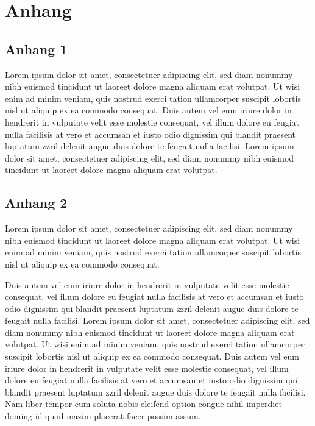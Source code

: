 \chapter {Anhang}

\section{Anhang 1}

Lorem ipsum dolor sit amet, consectetuer adipiscing elit, sed diam
nonummy nibh euismod tincidunt ut laoreet dolore magna aliquam erat
volutpat. Ut wisi enim ad minim veniam, quis nostrud exerci tation
ullamcorper suscipit lobortis nisl ut aliquip ex ea commodo
consequat. Duis autem vel eum iriure dolor in hendrerit in vulputate
velit esse molestie consequat, vel illum dolore eu feugiat nulla
facilisis at vero et accumsan et iusto odio dignissim qui blandit
praesent luptatum zzril delenit augue duis dolore te feugait nulla
facilisi. Lorem ipsum dolor sit amet, consectetuer adipiscing elit,
sed diam nonummy nibh euismod tincidunt ut laoreet dolore magna
aliquam erat volutpat.

\section{Anhang 2}

Lorem ipsum dolor sit amet, consectetuer adipiscing elit, sed diam
nonummy nibh euismod tincidunt ut laoreet dolore magna aliquam erat
volutpat. Ut wisi enim ad minim veniam, quis nostrud exerci tation
ullamcorper suscipit lobortis nisl ut aliquip ex ea commodo
consequat.


Duis autem vel eum iriure dolor in hendrerit in vulputate velit esse
molestie consequat, vel illum dolore eu feugiat nulla facilisis at
vero et accumsan et iusto odio dignissim qui blandit praesent
luptatum zzril delenit augue duis dolore te feugait nulla facilisi.
Lorem ipsum dolor sit amet, consectetuer adipiscing elit, sed diam
nonummy nibh euismod tincidunt ut laoreet dolore magna aliquam erat
volutpat. Ut wisi enim ad minim veniam, quis nostrud exerci tation
ullamcorper suscipit lobortis nisl ut aliquip ex ea commodo
consequat. Duis autem vel eum iriure dolor in hendrerit in vulputate
velit esse molestie consequat, vel illum dolore eu feugiat nulla
facilisis at vero et accumsan et iusto odio dignissim qui blandit
praesent luptatum zzril delenit augue duis dolore te feugait nulla
facilisi. Nam liber tempor cum soluta nobis eleifend option congue
nihil imperdiet doming id quod mazim placerat facer possim assum.
